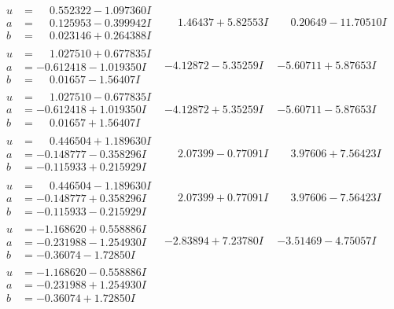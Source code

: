 \documentclass[1p]{elsarticle_modified}
\theoremstyle{definition}
\begin{document}
$$\begin{array}{c|c|c}
\begin{aligned}
u &= \phantom{-}0.552322 - 1.097360 I \\
a &= \phantom{-}0.125953 - 0.399942 I \\
b &= \phantom{-}0.023146 + 0.264388 I\end{aligned}
 & \phantom{-}1.46437 + 5.82553 I & \phantom{-}0.20649 - 11.70510 I \\ \hline\begin{aligned}
u &= \phantom{-}1.027510 + 0.677835 I \\
a &= -0.612418 - 1.019350 I \\
b &= \phantom{-}0.01657 - 1.56407 I\end{aligned}
 & -4.12872 - 5.35259 I & -5.60711 + 5.87653 I \\ \hline\begin{aligned}
u &= \phantom{-}1.027510 - 0.677835 I \\
a &= -0.612418 + 1.019350 I \\
b &= \phantom{-}0.01657 + 1.56407 I\end{aligned}
 & -4.12872 + 5.35259 I & -5.60711 - 5.87653 I \\ \hline\begin{aligned}
u &= \phantom{-}0.446504 + 1.189630 I \\
a &= -0.148777 - 0.358296 I \\
b &= -0.115933 + 0.215929 I\end{aligned}
 & \phantom{-}2.07399 - 0.77091 I & \phantom{-}3.97606 + 7.56423 I \\ \hline\begin{aligned}
u &= \phantom{-}0.446504 - 1.189630 I \\
a &= -0.148777 + 0.358296 I \\
b &= -0.115933 - 0.215929 I\end{aligned}
 & \phantom{-}2.07399 + 0.77091 I & \phantom{-}3.97606 - 7.56423 I \\ \hline\begin{aligned}
u &= -1.168620 + 0.558886 I \\
a &= -0.231988 - 1.254930 I \\
b &= -0.36074 - 1.72850 I\end{aligned}
 & -2.83894 + 7.23780 I & -3.51469 - 4.75057 I \\ \hline\begin{aligned}
u &= -1.168620 - 0.558886 I \\
a &= -0.231988 + 1.254930 I \\
b &= -0.36074 + 1.72850 I\end{aligned}

\end{array}$$
\end{document}
